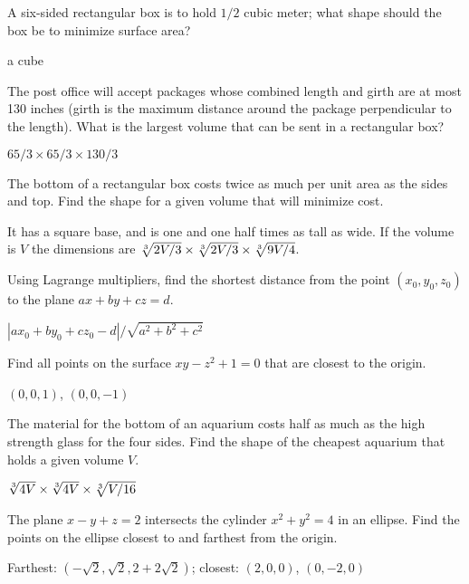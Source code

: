 \begin{exercises}

\exercise A six-sided rectangular box is to hold $1/2$ cubic meter;
what shape should the box be to minimize surface area?
\begin{answer} a cube
\end{answer}

\exercise The post office will accept packages whose combined length
and girth are at most 130 inches (girth is the maximum distance around
the package perpendicular to the length). What is the largest volume
that can be sent in a rectangular box?
\begin{answer} $65/3\times 65/3\times 130/3$
\end{answer}

\exercise The bottom of a rectangular box costs twice as much per unit
area as the sides and top. Find the shape for a given volume that will
minimize cost.
\begin{answer} It has a square base, and is one and one half times as tall as wide.
If the volume is $V$ the dimensions are $\root 3 \of {2V/3}\times
\root 3 \of {2V/3}\times \root 3\of {9V/4}$.
\end{answer}

\exercise Using Lagrange multipliers, find the shortest
distance from the point $(x_0,y_0,z_0)$ to the plane $ax+by+cz=d$.
\begin{answer} $|ax_0+by_0+cz_0-d|/\sqrt{a^2+b^2+c^2}$
\end{answer}

\exercise Find all points on the surface $xy-z^2+1=0$ that are closest
to the origin.
\begin{answer} $(0,0,1)$, $(0,0,-1)$
\end{answer}

\exercise The material for the bottom of an aquarium costs half as
much as the high strength glass for the four sides. Find the shape of
the cheapest aquarium that holds a given volume $V$.
\begin{answer} $\root 3\of{4V}\times\root 3\of{4V}\times\root 3\of{V/16}$
\end{answer}

\exercise The plane $x-y+z=2$ intersects the cylinder $x^2+y^2=4$ in an
ellipse. Find the points on the ellipse closest to and farthest from
the origin.
\begin{answer} Farthest: $(-\sqrt2,\sqrt2,2+2\sqrt2)$; closest:
$(2,0,0)$, $(0,-2,0)$
\end{answer}


\end{exercises}
